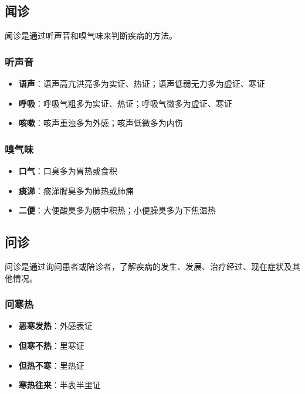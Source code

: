 \documentclass[12pt,UTF8]{ctexbook}
\begin{document}
\subsection{闻诊}

闻诊是通过听声音和嗅气味来判断疾病的方法。

\subsubsection{听声音}

\begin{itemize}
\item \textbf{语声}：语声高亢洪亮多为实证、热证；语声低弱无力多为虚证、寒证
\item \textbf{呼吸}：呼吸气粗多为实证、热证；呼吸气微多为虚证、寒证
\item \textbf{咳嗽}：咳声重浊多为外感；咳声低微多为内伤
\end{itemize}

\subsubsection{嗅气味}

\begin{itemize}
\item \textbf{口气}：口臭多为胃热或食积
\item \textbf{痰涕}：痰涕腥臭多为肺热或肺痈
\item \textbf{二便}：大便酸臭多为肠中积热；小便臊臭多为下焦湿热
\end{itemize}

\subsection{问诊}

问诊是通过询问患者或陪诊者，了解疾病的发生、发展、治疗经过、现在症状及其他情况。

\subsubsection{问寒热}

\begin{itemize}
\item \textbf{恶寒发热}：外感表证
\item \textbf{但寒不热}：里寒证
\item \textbf{但热不寒}：里热证
\item \textbf{寒热往来}：半表半里证
\end{itemize}
\end{document}
